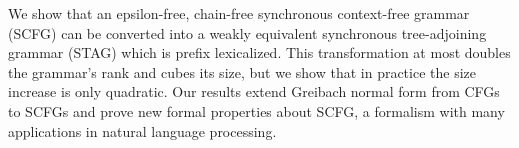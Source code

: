 We show that an epsilon-free, chain-free synchronous context-free grammar (SCFG) can be converted into a weakly equivalent synchronous tree-adjoining grammar (STAG) which is prefix lexicalized. This transformation at most doubles the grammar's rank and cubes its size, but we show that in practice the size increase is only quadratic. Our results extend Greibach normal form from CFGs to SCFGs and prove new formal properties about SCFG, a formalism with many applications in natural language processing.
